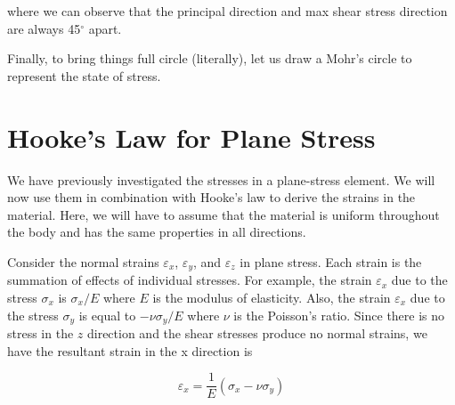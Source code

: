\documentclass[
10pt,
a4paper,
openany,
svgnames,
]{kaobook} %
\begin{document}
\begin{solution}
  where we can observe that the principal direction and max shear stress direction are always 45$^{\circ}$ apart.

  Finally, to bring things full circle (literally), let us draw a Mohr's circle to represent the state of stress.

  \begin{figure}[H]
    \centering
  \end{figure}
\end{solution}

\section{Hooke’s Law for Plane Stress}

We have previously investigated the stresses in a plane-stress element. We will now use them in combination with Hooke’s law to derive the strains in the material. Here, we will have to assume that the material is uniform throughout the body and has the same properties in all directions.

Consider the normal strains $\varepsilon_x$, $\varepsilon_y$, and $\varepsilon_z$ in plane stress. Each strain is the summation of effects of individual stresses. For example, the strain $\varepsilon_x$ due to the stress $\sigma_x$ is $\sigma_x / E$ where $E$ is the modulus of elasticity. Also, the strain $\varepsilon_x$ due to the stress $\sigma_y$ is equal to $-\nu \sigma_y / E$ where $\nu$ is the Poisson’s ratio. Since there is no stress in the $z$ direction and the shear stresses produce no normal strains, we have the resultant strain in the x direction is

\begin{equation} \label{eqn: plane stress x}
  \varepsilon_x = \frac{1}{E}(\sigma_x - \nu \sigma_y)
\end{equation}
\end{document}
